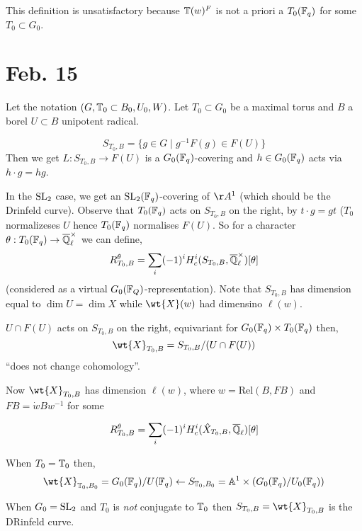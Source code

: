 \documentclass[12pt]{article}
\begin{document}
This definition is unsatisfactory because $\mathbb{T}(w)^F$ is not a priori a $T_0(\mathbb{F}_q)$ for some $T_0 \subset G_0$.

\section{Feb. 15}

Let the notation $(G, \mathbb{T}_0 \subset B_0, U_0, W)$. Let $T_0 \subset G_0$ be a maximal torus and $B$ a borel $U \subset B$ unipotent radical.

\begin{defn}
\[ S_{T_0, B} = \{g \in G \mid g^{-1} F(g) \in F(U) \} \]
Then we get $L : S_{T_0, B} \to F(U)$ is a $G_0(\mathbb{F}_q)$-covering and $h \in G_0(\mathbb{F}_q)$ acts via $h \cdot g = hg$. 
\end{defn}

In the $\mathrm{SL}_2$ case, we get an $\mathrm{SL}_2(\mathbb{F}_q)$-covering of $\AA^1$ (which should be the Drinfeld curve). Observe that $T_0(\mathbb{F}_q)$ acts on $S_{T_0, B}$ on the right, by $t \cdot g = gt$ ($T_0$ normalizeses $U$ hence $T_0(\mathbb{F}_q)$ normalises $F(U)$. So for a character $\theta : T_0(\mathbb{F}_q) \to \overline{\mathbb{Q}}_\ell^\times$ we can define,
\[ R^\theta_{T_0, B} = \sum_{i} (-1)^i H_c^i(S_{T_0, B}, \overline{\mathbb{Q}}_\ell^\times)[\theta] \]
(considered as a virtual $G_0(\mathbb{F}_Q)$-representation). Note that $S_{T_0, B}$ has dimension equal to $\dim{U} = \dim{X}$ while $\wt{X}(w)$ had dimensino $\ell(w)$.

\begin{rmk}
$U \cap F(U)$ acts on $S_{T_0, B}$ on the right, equivariant for $G_0(\mathbb{F}_q) \times T_0(\mathbb{F}_q)$ then,
\[ \wt{X}_{T_0, B} = S_{T_0, B} / (U \cap F(U)) \]
``does not change cohomology''. 
\end{rmk}

Now $\wt{X}_{T_0, B}$ has dimension $\ell(w)$, where $w = \mathrm{Rel}(B, F B)$ and $FB = \dot{w} B w^{-1}$ for some 

\[ R^\theta_{T_0, B} = \sum_i (-1)^i H^i_c(\hat{X}_{T_0, B}, \overline{\mathbb{Q}}_\ell)[\theta] \]

When $T_0 = \mathbb{T}_0$ then,
\[ \wt{X}_{\TT_0, B_0} = G_0(\FF_q) / U(\FF_q) \leftarrow S_{\TT_0, B_0} = \A^1 \times (G_0(\FF_q) / U_0(\FF_q)) \]

\begin{example}
When $G_0 = \mathrm{SL}_2$ and $T_0$ is \textit{not} conjugate to $\mathbb{T}_0$ then $S_{T_0, B} = \wt{X}_{T_0, B}$ is the DRinfeld curve.
\end{example}
\end{document}
